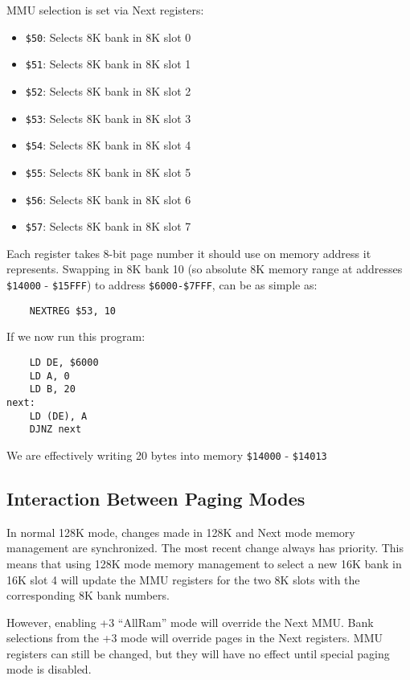 \documentclass[12pt,twoside,openright,a4paper]{book}
\begin{document}
MMU selection is set via Next registers:

\begin{itemize}[topsep=1pt,itemsep=1pt]
	\item {\tt \$50}: Selects 8K bank in 8K slot 0
	\item {\tt \$51}: Selects 8K bank in 8K slot 1
	\item {\tt \$52}: Selects 8K bank in 8K slot 2
	\item {\tt \$53}: Selects 8K bank in 8K slot 3
	\item {\tt \$54}: Selects 8K bank in 8K slot 4
	\item {\tt \$55}: Selects 8K bank in 8K slot 5
	\item {\tt \$56}: Selects 8K bank in 8K slot 6
	\item {\tt \$57}: Selects 8K bank in 8K slot 7
\end{itemize}

Each register takes 8-bit page number it should use on memory address it represents. Swapping in 8K bank 10 (so absolute 8K memory range at addresses {\tt \$14000} - {\tt \$15FFF}) to address {\tt \$6000-\$7FFF}, can be as simple as:

\begin{Verbatim}
	NEXTREG $53, 10
\end{Verbatim}

If we now run this program:

\begin{Verbatim}
	LD DE, $6000
	LD A, 0
	LD B, 20
next:
	LD (DE), A
	DJNZ next
\end{Verbatim}

We are effectively writing 20 bytes into memory {\tt \$14000} - {\tt \$14013}

\subsection{Interaction Between Paging Modes}

In normal 128K mode, changes made in 128K and Next mode memory management are synchronized. The most recent change always has priority. This means that using 128K mode memory management to select a new 16K bank in 16K slot 4 will update the MMU registers for the two 8K slots with the corresponding 8K bank numbers.

However, enabling +3 ``AllRam'' mode will override the Next MMU. Bank selections from the +3 mode will override pages in the Next registers. MMU registers can still be changed, but they will have no effect until special paging mode is disabled.
\end{document}
